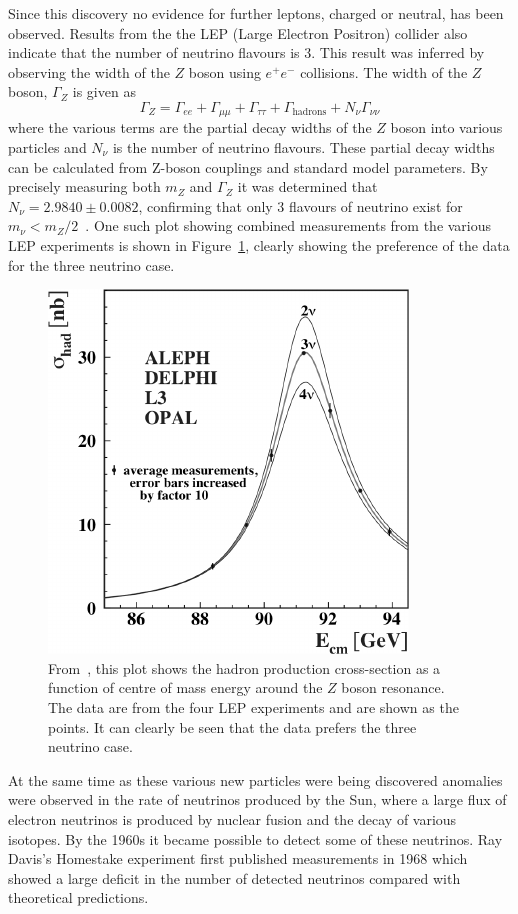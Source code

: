 Since this discovery no evidence for further leptons, charged or neutral, has been observed.
Results from the the LEP (Large Electron Positron) collider also indicate that the number of neutrino flavours is 3.
This result was inferred by observing the width of the $Z$ boson using $e^{+}e^{-}$ collisions.
The width of the $Z$ boson, $\Gamma_{Z}$ is given as
\begin{equation}
  \Gamma_{Z} = \Gamma_{ee} + \Gamma_{\mu\mu} + \Gamma_{\tau\tau} + \Gamma_{\text{hadrons}} + N_{\nu}\Gamma_{\nu\nu}
\end{equation}
where the various terms are the partial decay widths of the $Z$ boson into various particles and $N_{\nu}$ is the number of neutrino flavours.
These partial decay widths can be calculated from Z-boson couplings and standard model parameters.
By precisely measuring both $m_{Z}$ and $\Gamma_{Z}$ it was determined that $N_{\nu} = 2.9840 \pm 0.0082$, confirming that only 3 flavours of neutrino exist for $m_{\nu} < m_{Z}/2$~\cite{zBosonWidth}.
One such plot showing combined measurements from the various LEP experiments is shown in Figure~\ref{fig:zBosonWidth}, clearly showing the preference of the data for the three neutrino case.

\begin{figure}[h]
  \centering
  \includegraphics[width=.5\linewidth]{files/figures/historical_context/zBosonWidth}
  \caption{From~\cite{zBosonWidth}, this plot shows the hadron production cross-section as a function of centre of mass energy around the $Z$ boson resonance. The data are from the four LEP experiments and are shown as the points. It can clearly be seen that the data prefers the three neutrino case.}
  \label{fig:zBosonWidth}
\end{figure}

At the same time as these various new particles were being discovered anomalies were observed in the rate of neutrinos produced by the Sun, where a large flux of electron neutrinos is produced by nuclear fusion and the decay of various isotopes. 
By the 1960s it became possible to detect some of these neutrinos.
Ray Davis's Homestake experiment first published measurements in 1968 which showed a large deficit in the number of detected neutrinos compared with theoretical predictions.


